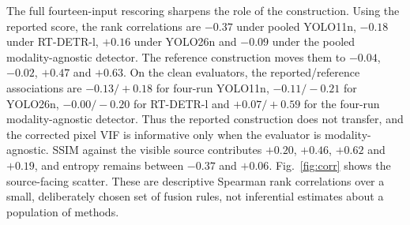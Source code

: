 \documentclass[10pt,a4paper]{article}
\begin{document}
\begin{sloppypar}
The full fourteen-input rescoring sharpens the role of the construction. Using the
reported score, the rank correlations are $-0.37$ under pooled YOLO11n, $-0.18$ under
RT-DETR-l, $+0.16$ under YOLO26n and $-0.09$ under the pooled modality-agnostic detector.
The reference construction moves them to $-0.04$, $-0.02$, $+0.47$ and $+0.63$. On the
clean evaluators, the reported/reference associations are $-0.13/+0.18$ for four-run
YOLO11n, $-0.11/-0.21$ for YOLO26n, $-0.00/-0.20$ for RT-DETR-l and $+0.07/+0.59$
for the four-run modality-agnostic detector. Thus the reported construction does not
transfer, and the corrected pixel VIF is informative only when the evaluator is
modality-agnostic. SSIM against the visible
source contributes $+0.20$, $+0.46$, $+0.62$ and $+0.19$, and entropy remains between
$-0.37$ and $+0.06$. Fig.~\ref{fig:corr} shows the source-facing scatter.
These are descriptive Spearman rank correlations over a small, deliberately chosen set
of fusion rules, not inferential estimates about a population of methods.

\begin{table}[!t]\centering\small


\end{table}
\end{sloppypar}
\end{document}
